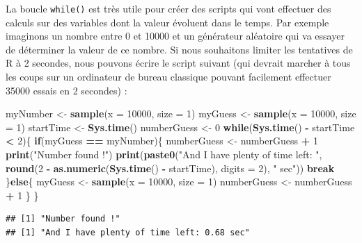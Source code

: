 \documentclass[
]{book}
\newenvironment{Shaded}{\begin{snugshade}}{\end{snugshade}}
\newcommand{\ControlFlowTok}[1]{\textcolor[rgb]{0.13,0.29,0.53}{\textbf{#1}}}
\newcommand{\DataTypeTok}[1]{\textcolor[rgb]{0.13,0.29,0.53}{#1}}
\newcommand{\DecValTok}[1]{\textcolor[rgb]{0.00,0.00,0.81}{#1}}
\newcommand{\KeywordTok}[1]{\textcolor[rgb]{0.13,0.29,0.53}{\textbf{#1}}}
\newcommand{\NormalTok}[1]{#1}
\newcommand{\OperatorTok}[1]{\textcolor[rgb]{0.81,0.36,0.00}{\textbf{#1}}}
\newcommand{\StringTok}[1]{\textcolor[rgb]{0.31,0.60,0.02}{#1}}
\begin{document}
La boucle \texttt{while()} est très utile pour créer des scripts qui vont effectuer des calculs sur des variables dont la valeur évoluent dans le temps. Par exemple imaginons un nombre entre 0 et 10000 et un générateur aléatoire qui va essayer de déterminer la valeur de ce nombre. Si nous souhaitons limiter les tentatives de R à 2 secondes, nous pouvons écrire le script suivant (qui devrait marcher à tous les coups sur un ordinateur de bureau classique pouvant facilement effectuer 35000 essais en 2 secondes) :

\begin{Shaded}
\begin{Highlighting}[]
\NormalTok{myNumber <-}\StringTok{ }\KeywordTok{sample}\NormalTok{(}\DataTypeTok{x =} \DecValTok{10000}\NormalTok{, }\DataTypeTok{size =} \DecValTok{1}\NormalTok{)}
\NormalTok{myGuess <-}\StringTok{ }\KeywordTok{sample}\NormalTok{(}\DataTypeTok{x =} \DecValTok{10000}\NormalTok{, }\DataTypeTok{size =} \DecValTok{1}\NormalTok{)}
\NormalTok{startTime <-}\StringTok{ }\KeywordTok{Sys.time}\NormalTok{()}
\NormalTok{numberGuess <-}\StringTok{ }\DecValTok{0}
\ControlFlowTok{while}\NormalTok{(}\KeywordTok{Sys.time}\NormalTok{() }\OperatorTok{-}\StringTok{ }\NormalTok{startTime }\OperatorTok{<}\StringTok{ }\DecValTok{2}\NormalTok{)\{}
  \ControlFlowTok{if}\NormalTok{(myGuess }\OperatorTok{==}\StringTok{ }\NormalTok{myNumber)\{}
\NormalTok{    numberGuess <-}\StringTok{ }\NormalTok{numberGuess }\OperatorTok{+}\StringTok{ }\DecValTok{1}
    \KeywordTok{print}\NormalTok{(}\StringTok{"Number found !"}\NormalTok{)}
    \KeywordTok{print}\NormalTok{(}\KeywordTok{paste0}\NormalTok{(}\StringTok{"And I have plenty of time left: "}\NormalTok{, }
      \KeywordTok{round}\NormalTok{(}\DecValTok{2} \OperatorTok{-}\StringTok{ }\KeywordTok{as.numeric}\NormalTok{(}\KeywordTok{Sys.time}\NormalTok{() }\OperatorTok{-}\StringTok{ }\NormalTok{startTime), }\DataTypeTok{digits =} \DecValTok{2}\NormalTok{), }
      \StringTok{" sec"}\NormalTok{))}
    \ControlFlowTok{break}
\NormalTok{  \}}\ControlFlowTok{else}\NormalTok{\{}
\NormalTok{    myGuess <-}\StringTok{ }\KeywordTok{sample}\NormalTok{(}\DataTypeTok{x =} \DecValTok{10000}\NormalTok{, }\DataTypeTok{size =} \DecValTok{1}\NormalTok{)}
\NormalTok{    numberGuess <-}\StringTok{ }\NormalTok{numberGuess }\OperatorTok{+}\StringTok{ }\DecValTok{1}
\NormalTok{  \}}
\NormalTok{\}}
\end{Highlighting}
\end{Shaded}

\begin{verbatim}
## [1] "Number found !"
## [1] "And I have plenty of time left: 0.68 sec"
\end{verbatim}
\end{document}
